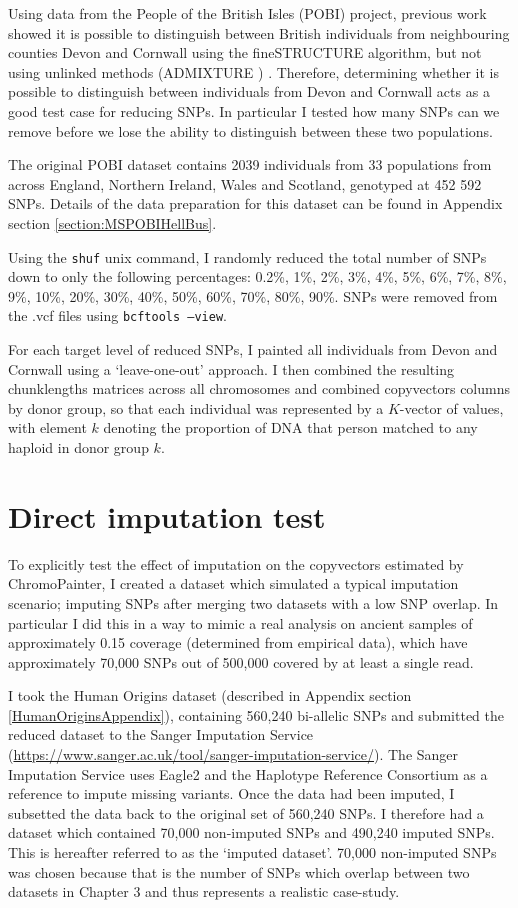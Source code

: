 {Using data from the People of the British Isles (POBI) project, previous work showed it is possible to distinguish between British individuals from neighbouring counties Devon and Cornwall using the fineSTRUCTURE algorithm, but not using unlinked methods (ADMIXTURE \cite{alexander2009fast}) \cite{Leslie2015}. Therefore, determining whether it is possible to distinguish between individuals from Devon and Cornwall acts as a good test case for reducing SNPs. In particular I tested how many SNPs can we remove before we lose the ability to distinguish between these two populations.


The original POBI dataset contains 2039 individuals from 33 populations from across England, Northern Ireland, Wales and Scotland, genotyped at 452 592 SNPs. Details of the data preparation for this dataset can be found in Appendix section \ref{section:MSPOBIHellBus}.

Using the \texttt{shuf} unix command, I randomly reduced the total number of SNPs down to only the following percentages: 0.2\%, 1\%, 2\%, 3\%, 4\%, 5\%, 6\%, 7\%, 8\%, 9\%, 10\%, 20\%, 30\%, 40\%, 50\%, 60\%, 70\%, 80\%, 90\%. SNPs were removed from the .vcf files using \texttt{bcftools --view}.

For each target level of reduced SNPs, I painted all individuals from Devon and Cornwall using a `leave-one-out' approach. I then combined the resulting chunklengths matrices across all chromosomes and combined copyvectors columns by donor group, so that each individual was represented by a $K$-vector of values, with element $k$ denoting the proportion of DNA that person matched to any haploid in donor group $k$.

\section{Direct imputation test}

To explicitly test the effect of imputation on the copyvectors estimated by ChromoPainter, I created a dataset which simulated a typical imputation scenario; imputing SNPs after merging two datasets with a low SNP overlap. In particular I did this in a way to mimic a real analysis on ancient samples of approximately 0.15 coverage (determined from empirical data), which have approximately 70,000 SNPs out of 500,000 covered by at least a single read. 

I took the Human Origins dataset (described in Appendix section \ref{HumanOriginsAppendix}), containing 560,240 bi-allelic SNPs and submitted the reduced dataset to the Sanger Imputation Service (\url{https://www.sanger.ac.uk/tool/sanger-imputation-service/}). The Sanger Imputation Service uses Eagle2 \cite{loh2016reference} and the Haplotype Reference Consortium as a reference to impute missing variants. Once the data had been imputed, I subsetted the data back to the original set of 560,240 SNPs. I therefore had a dataset which contained 70,000 non-imputed SNPs and 490,240 imputed SNPs. This is hereafter referred to as the `imputed dataset'. 70,000 non-imputed SNPs was chosen because that is the number of SNPs which overlap between two datasets in Chapter 3 and thus represents a realistic case-study. 

}

